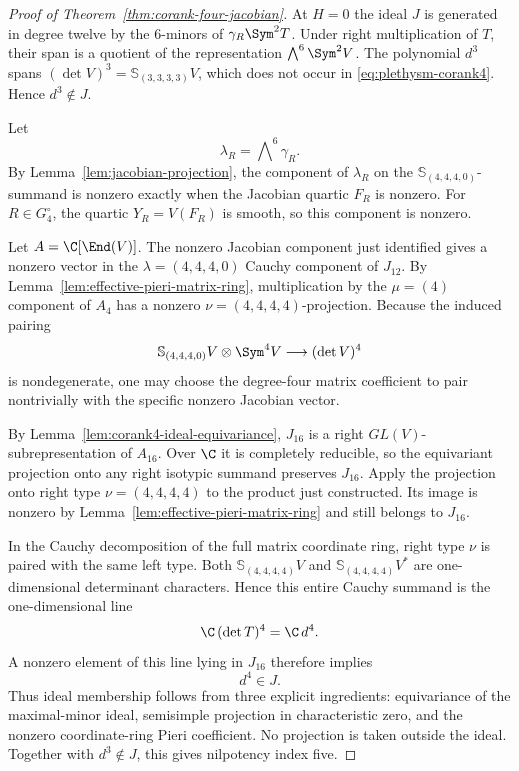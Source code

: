 \begin{proof}[Proof of Theorem~\ref{thm:corank-four-jacobian}]
At \(H=0\) the ideal \(J\) is generated in degree twelve by the
\(6\)-minors of \(\gamma_R\Sym^2T\).  Under right multiplication of
\(T\), their span is a quotient of the representation
\(\bigwedge^6\Sym^2V\).  The polynomial \(d^3\) spans
\((\det V)^3=\mathbb S_{(3,3,3,3)}V\), which does not occur in
\eqref{eq:plethysm-corank4}.  Hence \(d^3\notin J\).

Let
\[
 \lambda_R=\bigwedge\nolimits^6\gamma_R.
\]
By Lemma~\ref{lem:jacobian-projection}, the component of
\(\lambda_R\) on the
\(\mathbb S_{(4,4,4,0)}\)-summand is nonzero exactly when the
Jacobian quartic \(F_R\) is nonzero.  For \(R\in G_4^\circ\), the
quartic \(Y_R=V(F_R)\) is smooth, so this component is nonzero.

Let \(A=\C[\End(V)]\).  The nonzero Jacobian component just
identified gives a nonzero vector in the
\(\lambda=(4,4,4,0)\) Cauchy component of \(J_{12}\).
By Lemma~\ref{lem:effective-pieri-matrix-ring}, multiplication by
the \(\mu=(4)\) component of \(A_4\) has a nonzero
\(\nu=(4,4,4,4)\)-projection.  Because the induced pairing
\[
 \mathbb S_{(4,4,4,0)}V\otimes\Sym^4V
 \longrightarrow(\det V)^4
\]
is nondegenerate, one may choose the degree-four matrix coefficient
to pair nontrivially with the specific nonzero Jacobian vector.

By Lemma~\ref{lem:corank4-ideal-equivariance}, \(J_{16}\) is a
right \(GL(V)\)-subrepresentation of \(A_{16}\).  Over \(\C\) it is
completely reducible, so the equivariant projection onto any right
isotypic summand preserves \(J_{16}\).  Apply the projection onto
right type \(\nu=(4,4,4,4)\) to the product just constructed.  Its
image is nonzero by Lemma~\ref{lem:effective-pieri-matrix-ring} and
still belongs to \(J_{16}\).

In the Cauchy decomposition of the full matrix coordinate ring, right
type \(\nu\) is paired with the same left type.  Both
\(\mathbb S_{(4,4,4,4)}V\) and
\(\mathbb S_{(4,4,4,4)}V^*\) are one-dimensional determinant
characters.  Hence this entire Cauchy summand is the one-dimensional
line
\[
 \C\,(\det T)^4=\C\,d^4.
\]
A nonzero element of this line lying in \(J_{16}\) therefore implies
\[
 d^4\in J.
\]
Thus ideal membership follows from three explicit ingredients:
equivariance of the maximal-minor ideal, semisimple projection in
characteristic zero, and the nonzero coordinate-ring Pieri
coefficient.  No projection is taken outside the ideal.  Together with \(d^3\notin J\), this
gives nilpotency index five.
\end{proof}

